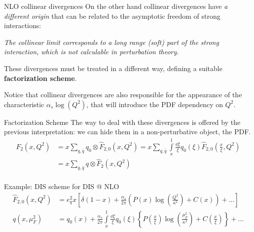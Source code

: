 \documentclass[9pt]{beamer}
\begin{document}
\begin{frame}{NLO collinear divergences}
    On the other hand collinear divergences have \textit{a different origin}
    that can be related to the asymptotic freedom of strong interactions:

    \begin{center}
        \textit{The collinear limit corresponds to a long range (soft) part of
        the strong interaction, which is not calculable in perturbation
        theory.}
    \end{center}

    These divergences must be treated in a different way, defining a suitable
    \textbf{factorization scheme}.\newline

    Notice that collinear divergences are also responsible for the appearance
    of the characteristic $\alpha_s \log(Q^2)$, that will introduce the PDF
    dependency on $Q^2$.
\end{frame}

\begin{frame}{Factorization Scheme}
    \vspace*{15pt}
    The way to deal with these divergences is offered by the previous
    interpretation: we can hide them in a non-perturbative object, the PDF.
    \begin{align*}
        F_2(x,Q^2) &= x\sum_{q,\bar{q}} q_0 \otimes \hat{F}_{2,0} (x, Q^2) =
        x \sum_{q,\bar{q}} \int\limits_x^1 \frac{\dd\xi}{\xi} q_0(\xi)
        \hat{F}_{2,0}\left(\frac{x}{\xi},Q^2\right)\\
        &= x \sum_{q,\bar{q}} q \otimes \hat{F}_2 (x, Q^2)\\
    \end{align*}
    \vspace*{-15pt}

    Example: DIS scheme for DIS @ NLO
    \begin{align*}
        \hat{F}_{2,0}(x,Q^2) &= e_q^2 x \left[ \delta(1-x) +
        \frac{\alpha_s}{2\pi}\left(P(x) \log(\frac{Q^2}{\kappa^2}) +
        C(x)\right) + \dots \right]\\
        q(x, \mu^2_F) &= q_0(x) + \frac{\alpha_s}{2\pi} \int\limits_x^1
        \frac{\dd \xi}{\xi} q_0(\xi) \left\{ P\left(\frac{x}{\xi}\right)
        \log(\frac{\mu^2_F}{\kappa^2}) + C\left(\frac{x}{\xi}\right)\right\} +
        \dots
    \end{align*}
\end{frame}
\end{document}
